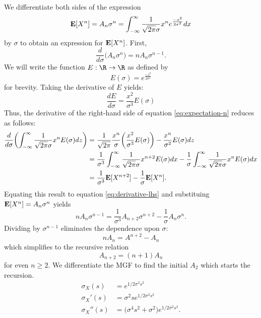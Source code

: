 \documentclass{homework}
\begin{document}
We differentiate both sides of the expression
\begin{equation}
    {\bf E}[X^n] = A_n \sigma^n = \int_{-\infty}^{\infty}
        \frac{1}{\sqrt{2\pi}\sigma} x^n e^{\frac{-x^2}{2\sigma^2}} dx
    \label{eq:expectation-n}
\end{equation}
by $\sigma$ to obtain an expression for ${\bf E}[X^n]$. First,
\begin{equation}
    \frac{d}{d\sigma}\biggl(A_n \sigma^n\biggr) = nA_n \sigma^{n-1}.
    \label{eq:derivative-lhs}
\end{equation}
We will write the function $E: \R \to \R$ as defined by
\begin{equation*}
    E(\sigma) = e^{\frac{-z^2}{2\sigma^2}}
\end{equation*}
for brevity. Taking the derivative of $E$ yields:
\begin{equation*}
    \frac{dE}{d\sigma} = \frac{x^2}{\sigma^3} E(\sigma)
\end{equation*}
Thus, the derivative of the right-hand side of equation \ref{eq:expectation-n}
reduces as follows:
\begin{align*}
    \frac{d}{d\sigma}\biggl(
        \int_{-\infty}^{\infty}
                \frac{1}{\sqrt{2\pi}\sigma} x^n E(\sigma) dz
    \biggr) &= \frac{1}{\sqrt{2\pi}} \frac{x^n}{\sigma} \biggl(
        \frac{x^2}{\sigma^3} E(\sigma)
    \biggr)
        - \frac{x^n}{\sigma^2} E(\sigma) dz \\
        &= \frac{1}{\sigma^3}
        \int_{-\infty}^{\infty} \frac{1}{\sqrt{2\pi}\sigma} x^{n+2} E(\sigma) dx
        - \frac{1}{\sigma}
        \int_{-\infty}^{\infty} \frac{1}{\sqrt{2\pi}\sigma} x^{n} E(\sigma) dx \\
        &= \frac{1}{\sigma^3} {\bf E}[X^{n+2}] - \frac{1}{\sigma} {\bf E}[X^n].
\end{align*}
Equating this result to equation \ref{eq:derivative-lhs} and substituing
${\bf E}[X^n] = A_n \sigma^n$ yields
\begin{equation*}
    nA_n \sigma^{n-1} = \frac{1}{\sigma^3} A_{n+2}\sigma^{n+2} - \frac{1}{\sigma} A_n \sigma^n.
\end{equation*}
Dividing by $\sigma^{n-1}$ eliminates the dependence upon $\sigma$:
\begin{equation*}
    nA_n = A^{n+2} - A_n
\end{equation*}
which simplifies to the recursive relation
\begin{equation*}
    A_{n+2} = (n+1) A_n
\end{equation*}
for even $n\geq 2$. We differentiate the MGF to find the initial $A_2$ which
starts the recursion.
\begin{align*}
    \sigma_X(s) &= e^{1/2 \sigma^2 s^2} \\
    \sigma_X'(s) &= \sigma^2 s e^{1/2 \sigma^2 s^2} \\
    \sigma_X''(s) &= \biggl(
        \sigma^4 s^2 + \sigma^2
    \biggr) e^{1/2 \sigma^2 s^2}.
\end{align*}
\end{document}
